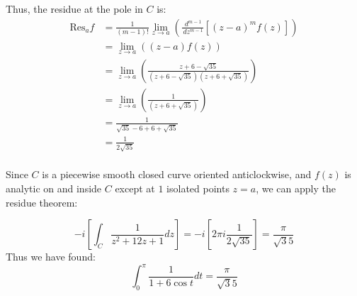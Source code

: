 \documentclass[a4paper, 11pt]{article}
\def\dd#1#2{\frac{\,d#1}{\,d#2}}
\begin{document}
\begin{multicols}{2}
	Thus, the residue at the pole in $C$ is:
	\begin{align*}
		\text{Res}_a f & = \frac 1{(m-1)!}\lim_{z\to a} \left( \dd{^{m-1}}{z^{m-1}} \left[ (z-a)^m f(z) \right] \right) \\
		               & =\lim_{z\to a} \left( (z-a)f(z) \right)                                                        \\
		               & =\lim_{z\to a} \left(  \frac{z+6-\sqrt{35}}{(z+6-\sqrt{35})(z+6+\sqrt{35})}\right)             \\
		               & =\lim_{z\to a} \left(  \frac{1}{(z+6+\sqrt{35})}\right)                                        \\
		               & =  \frac{1}{\sqrt{35}-6+6+\sqrt{35}}                                                           \\
		               & =  \frac{1}{2\sqrt{35}}                                                                        \\
	\end{align*}




	Since $C$ is a piecewise smooth closed curve oriented anticlockwise, and $f(z)$ is analytic on and inside $C$ except at $1$ isolated points $z=a$, we can apply the residue theorem:

	\[
		-i \left[ \int_C\frac{1}{ z^2+12z+1 }dz  \right]  = -i \left[ 2\pi i \frac{1}{2\sqrt {35}} \right] = \frac{\pi}{\sqrt 35}
	\]
	Thus we have found:
	\[
		\int_0^{\pi} \frac 1{1+6\cos t}dt = \frac{\pi}{\sqrt 35}
	\]


\end{multicols}
\end{document}
